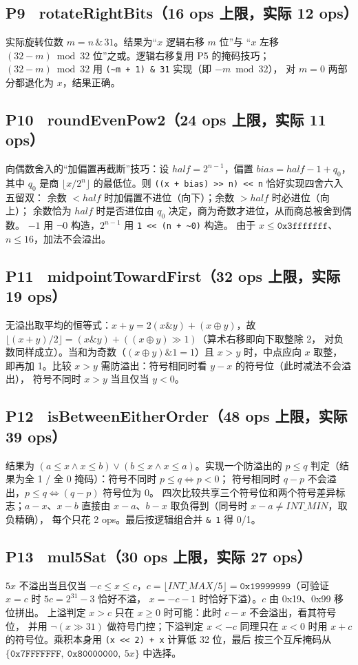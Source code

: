 \documentclass[11pt]{ctexart}
\begin{document}
\subsection{P9 \ rotateRightBits（16 ops 上限，实际 12 ops）}
实际旋转位数 $m = n \,\&\, 31$。结果为``$x$ 逻辑右移 $m$ 位''与
``$x$ 左移 $(32-m) \bmod 32$ 位''之或。逻辑右移复用 P5 的掩码技巧；
$(32-m) \bmod 32$ 用 \lstinline|(~m + 1) & 31| 实现（即 $-m \bmod 32$），
对 $m=0$ 两部分都退化为 $x$，结果正确。

\subsection{P10 \ roundEvenPow2（24 ops 上限，实际 11 ops）}
向偶数舍入的``加偏置再截断''技巧：设 $\mathit{half}=2^{n-1}$，偏置
$\mathit{bias} = \mathit{half} - 1 + q_0$，其中 $q_0$ 是商 $\lfloor x/2^n\rfloor$
的最低位。则 \lstinline|((x + bias) >> n) << n| 恰好实现四舍六入五留双：
余数 $<\mathit{half}$ 时加偏置不进位（向下）；余数 $>\mathit{half}$ 时必进位（向上）；
余数恰为 $\mathit{half}$ 时是否进位由 $q_0$ 决定，商为奇数才进位，从而商总被舍到偶数。
$-1$ 用 $\lnot 0$ 构造，$2^{n-1}$ 用 \lstinline|1 << (n + ~0)| 构造。
由于 $x \le \texttt{0x3fffffff}$、$n \le 16$，加法不会溢出。

\subsection{P11 \ midpointTowardFirst（32 ops 上限，实际 19 ops）}
无溢出取平均的恒等式：$x+y = 2(x\&y) + (x\oplus y)$，故
$\lfloor (x+y)/2 \rfloor = (x\&y) + ((x\oplus y) \gg 1)$（算术右移即向下取整除 2，
对负数同样成立）。当和为奇数（$(x\oplus y)\&1=1$）且 $x>y$ 时，中点应向 $x$ 取整，
即再加 1。比较 $x>y$ 需防溢出：符号相同时看 $y-x$ 的符号位（此时减法不会溢出），
符号不同时 $x>y$ 当且仅当 $y<0$。

\subsection{P12 \ isBetweenEitherOrder（48 ops 上限，实际 39 ops）}
结果为 $(a\le x \land x\le b) \lor (b\le x \land x\le a)$。实现一个防溢出的
$p\le q$ 判定（结果为全 1 / 全 0 掩码）：符号不同时 $p\le q \iff p<0$；
符号相同时 $q-p$ 不会溢出，$p\le q \iff (q-p)$ 符号位为 0。
四次比较共享三个符号位和两个符号差异标志；$a-x$、$x-b$ 直接由
$x-a$、$b-x$ 取负得到（同号时 $x-a \ne \mathit{INT\_MIN}$，取负精确），
每个只花 2 ops。最后按逻辑组合并 \lstinline|& 1| 得 0/1。

\subsection{P13 \ mul5Sat（30 ops 上限，实际 27 ops）}
$5x$ 不溢出当且仅当 $-c \le x \le c$，$c = \lfloor \mathit{INT\_MAX}/5\rfloor
= \texttt{0x19999999}$（可验证 $x=c$ 时 $5c = 2^{31}-3$ 恰好不溢，
$x=-c-1$ 时恰好下溢）。$c$ 由 0x19、0x99 移位拼出。
上溢判定 $x>c$ 只在 $x\ge 0$ 时可能：此时 $c-x$ 不会溢出，看其符号位，
并用 $\lnot(x\gg 31)$ 做符号门控；下溢判定 $x<-c$ 同理只在 $x<0$ 时用
$x+c$ 的符号位。乘积本身用 \lstinline|(x << 2) + x| 计算低 32 位，最后
按三个互斥掩码从 $\{ \texttt{0x7FFFFFFF},\ \texttt{0x80000000},\ 5x \}$ 中选择。
\end{document}

